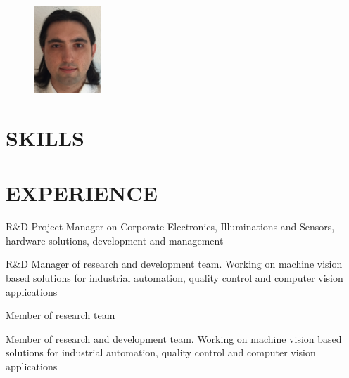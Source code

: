 \documentclass[margin]{res}
\begin{document}
	\address{Bordenbergweg Str. 64367, M\"uhltal\\
		\hspace{.5in}+49 176 62 01 37 66\\
		\hspace{.4in}cihansari86@gmail.com}
	\begin{resume}
		\begin{figure}
			\vspace{-1in}
			\includegraphics[width=1in]{me.jpg}
		\end{figure}
		
		\sectionspace
		\section{SKILLS}
		
		\sectionspace

		\section{EXPERIENCE}
		{R\&D Project Manager on Corporate Electronics, Illuminations and Sensors, hardware solutions, development and management}
		
		{R\&D Manager of research and development team. Working on machine vision based solutions for industrial automation, quality control and computer vision applications}
		
		{Member of research team}
		
		{Member of research and development team. Working on machine vision based solutions for industrial automation, quality control and computer vision applications}
		

\end{resume}
\end{document}
